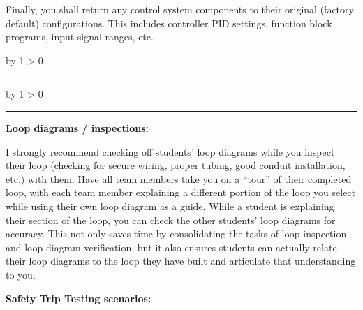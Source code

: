 \documentclass[12pt,a4paper]{article}
\def\svar{
           \advance\answnum by 1
           \ifnum \answnum > 0
                \hrule
                \vskip 3pt
                \leftline{Svar \the\answnum}
                \vskip 3pt \fi}
\def\notes{
           \advance\explnum by 1
           \ifnum \explnum > 0
                \hrule
                \vskip 3pt
                \leftline{Notes \the\explnum}
                \vskip 3pt \fi}
\begin{document}
\begin{itemize}
\vskip 10pt

Finally, you shall return any control system components to their original (factory default) configurations.  This includes controller PID settings, function block programs, input signal ranges, etc.


\vskip 10pt \filbreak 





\svar{} 


\vskip 10pt \filbreak 





\notes{} 

\noindent
{\bf Loop diagrams / inspections:}

I strongly recommend checking off students' loop diagrams while you inspect their loop (checking for secure wiring, proper tubing, good conduit installation, etc.) with them.  Have all team members take you on a ``tour'' of their completed loop, with each team member explaining a different portion of the loop you select while using their own loop diagram as a guide.  While a student is explaining their section of the loop, you can check the other students' loop diagrams for accuracy.  This not only saves time by consolidating the tasks of loop inspection and loop diagram verification, but it also ensures students can actually relate their loop diagrams to the loop they have built and articulate that understanding to you.

\vskip 10pt

\goodbreak

\noindent
{\bf Safety Trip Testing scenarios:}


\end{itemize}
\end{document}
